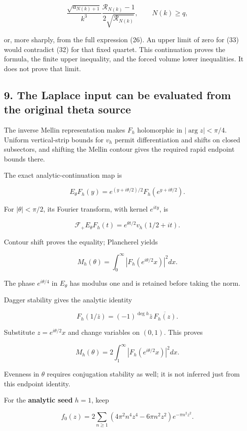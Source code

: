 \[
\frac{\sqrt{a_{N(k)+1}}}{k^3}
\frac{\mathcal R_{N(k)}-1}{2\sqrt{\mathcal R_{N(k)}}},
\qquad N(k)\ge q,
\tag{33}
\]

or, more sharply, from the full expression (26). An upper limit of zero
for (33) would contradict (32) for that fixed quartet. This continuation
proves the formula, the finite upper inequality, and the forced volume
lower inequalities. It does not prove that limit.

\subsection{9. The Laplace input can be evaluated from the original theta
source}\label{toda_volume:the-laplace-input-can-be-evaluated-from-the-original-theta-source}

The inverse Mellin representation makes \(F_h\) holomorphic in
\(|\arg z|<\pi/4\). Uniform vertical-strip bounds for \(v_h\) permit
differentiation and shifts on closed subsectors, and shifting the Mellin
contour gives the required rapid endpoint bounds there.

The exact analytic-continuation map is

\[
E_\theta F_h(y)
=e^{(y+i\theta/2)/2}F_h(e^{y+i\theta/2}).
\]

For \(|\theta|<\pi/2\), its Fourier transform, with kernel \(e^{ity}\),
is

\[
\mathcal F_+E_\theta F_h(t)=e^{\theta t/2}v_h(1/2+it).
\]

Contour shift proves the equality; Plancherel yields

\[
\boxed{M_h(\theta)=\int_0^\infty|F_h(e^{i\theta/2}x)|^2dx.}
\tag{34}
\]

The phase \(e^{i\theta/4}\) in \(E_\theta\) has modulus one and is
retained before taking the norm.

Dagger stability gives the analytic identity

\[
F_h(1/\bar z)=(-1)^{\deg h}\bar z\,\overline{F_h(z)}.
\]

Substitute \(z=e^{i\theta/2}x\) and change variables on \((0,1)\). This
proves

\[
\boxed{M_h(\theta)=2\int_1^\infty|F_h(e^{i\theta/2}x)|^2dx.}
\tag{35}
\]

Evenness in \(\theta\) requires conjugation stability as well; it is not
inferred just from this endpoint identity.

For the \textbf{analytic seed} \(h=1\), keep

\[
f_0(z)=2\sum_{n\ge1}(4\pi^2n^4z^4-6\pi n^2z^2)e^{-\pi n^2z^2}.
\]

